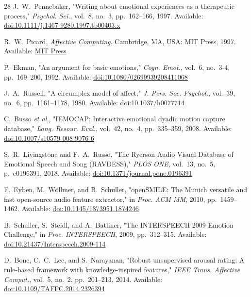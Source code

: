 \documentclass[journal,10pt,twocolumn]{IEEEtran}
\begin{document}
\begin{thebibliography}{28}
 J.~W.~Pennebaker, "Writing about emotional experiences as a therapeutic process," \textit{Psychol. Sci.}, vol.~8, no.~3, pp.~162--166, 1997. Available: \href{https://doi.org/10.1111/j.1467-9280.1997.tb00403.x}{doi:10.1111/j.1467-9280.1997.tb00403.x}

 R.~W.~Picard, \textit{Affective Computing}. Cambridge, MA, USA: MIT Press, 1997. Available: \href{https://mitpress.mit.edu/9780262661157/affective-computing/}{MIT Press}

 P.~Ekman, "An argument for basic emotions," \textit{Cogn. Emot.}, vol.~6, no.~3-4, pp.~169--200, 1992. Available: \href{https://doi.org/10.1080/02699939208411068}{doi:10.1080/02699939208411068}

 J.~A.~Russell, "A circumplex model of affect," \textit{J. Pers. Soc. Psychol.}, vol.~39, no.~6, pp.~1161--1178, 1980. Available: \href{https://doi.org/10.1037/h0077714}{doi:10.1037/h0077714}

 C.~Busso \textit{et al.}, "IEMOCAP: Interactive emotional dyadic motion capture database," \textit{Lang. Resour. Eval.}, vol.~42, no.~4, pp.~335--359, 2008. Available: \href{https://doi.org/10.1007/s10579-008-9076-6}{doi:10.1007/s10579-008-9076-6}

 S.~R.~Livingstone and F.~A.~Russo, "The Ryerson Audio-Visual Database of Emotional Speech and Song (RAVDESS)," \textit{PLOS ONE}, vol.~13, no.~5, p.~e0196391, 2018. Available: \href{https://doi.org/10.1371/journal.pone.0196391}{doi:10.1371/journal.pone.0196391}

 F.~Eyben, M.~Wöllmer, and B.~Schuller, "openSMILE: The Munich versatile and fast open-source audio feature extractor," in \textit{Proc. ACM MM}, 2010, pp.~1459--1462. Available: \href{https://doi.org/10.1145/1873951.1874246}{doi:10.1145/1873951.1874246}

 B.~Schuller, S.~Steidl, and A.~Batliner, "The INTERSPEECH 2009 Emotion Challenge," in \textit{Proc. INTERSPEECH}, 2009, pp.~312--315. Available: \href{https://doi.org/10.21437/Interspeech.2009-114}{doi:10.21437/Interspeech.2009-114}

 D.~Bone, C.~C.~Lee, and S.~Narayanan, "Robust unsupervised arousal rating: A rule-based framework with knowledge-inspired features," \textit{IEEE Trans. Affective Comput.}, vol.~5, no.~2, pp.~201--213, 2014. Available: \href{https://doi.org/10.1109/TAFFC.2014.2326394}{doi:10.1109/TAFFC.2014.2326394}


\end{thebibliography}
\end{document}

